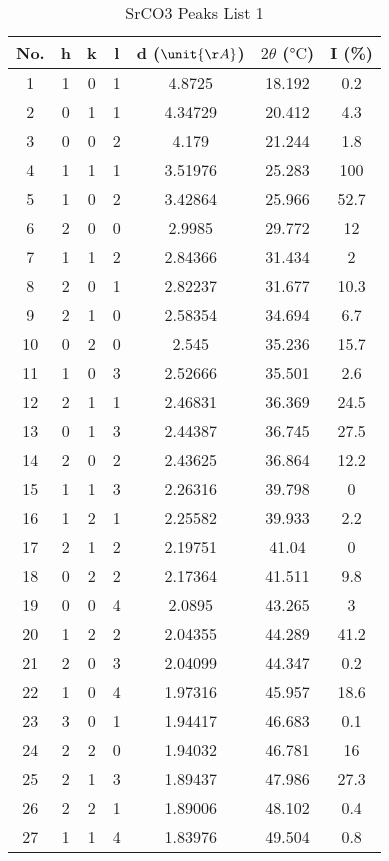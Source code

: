 \documentclass[11pt]{article}
\begin{document}
	
	\begin{table}[htbp]
		\centering
		\caption{SrCO3 Peaks List 1}
		\begin{tabular}{ccccccc}
			\toprule
			No. & h & k & l & d ($\unit{\AA}$) & $2\theta$ ($\unit{\degreeCelsius}$) & I (\%) \\
			\midrule
			1 & 1 & 0 & 1 & 4.8725 & 18.192 & 0.2 \\
			2 & 0 & 1 & 1 & 4.34729 & 20.412 & 4.3 \\
			3 & 0 & 0 & 2 & 4.179 & 21.244 & 1.8 \\
			4 & 1 & 1 & 1 & 3.51976 & 25.283 & 100 \\
			5 & 1 & 0 & 2 & 3.42864 & 25.966 & 52.7 \\
			6 & 2 & 0 & 0 & 2.9985 & 29.772 & 12 \\
			7 & 1 & 1 & 2 & 2.84366 & 31.434 & 2 \\
			8 & 2 & 0 & 1 & 2.82237 & 31.677 & 10.3 \\
			9 & 2 & 1 & 0 & 2.58354 & 34.694 & 6.7 \\
			10 & 0 & 2 & 0 & 2.545 & 35.236 & 15.7 \\
			11 & 1 & 0 & 3 & 2.52666 & 35.501 & 2.6 \\
			12 & 2 & 1 & 1 & 2.46831 & 36.369 & 24.5 \\
			13 & 0 & 1 & 3 & 2.44387 & 36.745 & 27.5 \\
			14 & 2 & 0 & 2 & 2.43625 & 36.864 & 12.2 \\
			15 & 1 & 1 & 3 & 2.26316 & 39.798 & 0 \\
			16 & 1 & 2 & 1 & 2.25582 & 39.933 & 2.2 \\
			17 & 2 & 1 & 2 & 2.19751 & 41.04 & 0 \\
			18 & 0 & 2 & 2 & 2.17364 & 41.511 & 9.8 \\
			19 & 0 & 0 & 4 & 2.0895 & 43.265 & 3 \\
			20 & 1 & 2 & 2 & 2.04355 & 44.289 & 41.2 \\
			21 & 2 & 0 & 3 & 2.04099 & 44.347 & 0.2 \\
			22 & 1 & 0 & 4 & 1.97316 & 45.957 & 18.6 \\
			23 & 3 & 0 & 1 & 1.94417 & 46.683 & 0.1 \\
			24 & 2 & 2 & 0 & 1.94032 & 46.781 & 16 \\
			25 & 2 & 1 & 3 & 1.89437 & 47.986 & 27.3 \\
			26 & 2 & 2 & 1 & 1.89006 & 48.102 & 0.4 \\
			27 & 1 & 1 & 4 & 1.83976 & 49.504 & 0.8 \\

\end{tabular}
\end{table}
\end{document}
